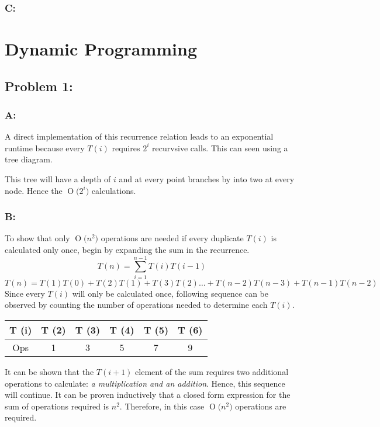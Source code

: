 \documentclass[12pt]{article}
\newcommand{\BigO}[1]{\ensuremath{\operatorname{O}\bigl(#1\bigr)}}
\begin{document}
\subsubsection*{C:}


\section*{Dynamic Programming}
\subsection*{Problem 1:}
\subsubsection*{A:}
A direct implementation of this recurrence relation leads to an exponential
runtime because every $T(i)$ requires $2^{i}$ recurvsive calls.  This can
seen using a tree diagram.\\ 
\begin{center}
\end{center}    
This tree will have a depth of $i$ and at every point branches by into 
two at every node.  Hence the \BigO{2^{i}} calculations. 

\subsubsection*{B:}
To show that only \BigO{n^2} operations are needed if every duplicate
$T(i)$ is calculated only once, begin by expanding the sum in the 
recurrence.
\[
T(n) = \sum_{i=1}^{n-1}T(i)T(i-1)
\]
\[ 
T(n) = T(1)T(0) + T(2)T(1) + T(3)T(2)\dots
+ T(n-2)T(n-3) + T(n-1)T(n-2)
\]
Since every $T(i)$ will only be calculated once, following sequence
can be observed by counting the number of operations needed to determine
each $T(i)$.

\begin{center}
    \begin{tabular}{c| c c c c c}
    T (i) & T (2) & T (3) & T (4) & T (5) & T (6) \\ \hline  
    Ops & 1 & 3 & 5 & 7 & 9 \\
    \end{tabular}
\end{center}
It can be shown that the $T(i+1)$ element of the sum requires two additional
operations to calculate: \textit{a multiplication and an addition}.  Hence,
this sequence will continue.  It can be proven inductively that a closed
form expression for the sum of operations required is $n^2$.  Therefore,
in this case \BigO{n^2} operations are required. 
\end{document}
